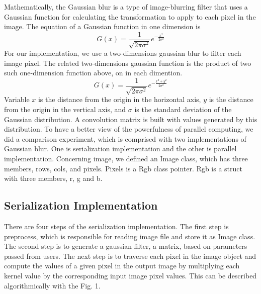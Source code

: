 \documentclass[journal,12pt,onecolumn,draftclsnofoot]{ieeeconf}  %
\begin{document}
Mathematically, the Gaussian blur is a type of image-blurring filter that uses a Gaussian function for calculating the transformation to apply to each pixel in the image. The equation of a Gaussian function in one dimension is 
    \[G(x) = \frac{1}{ \sqrt{2 \pi  \sigma ^{2} } } e^{ -\frac{ x^{2} }{2  \sigma ^{2} }} \]
 For our implementation, we use a two-dimensions gaussian blur to filter each image pixel. The related two-dimensions gaussian function is the product of two such one-dimension function above, on in each dimention. 
  \[G(x) = \frac{1}{ \sqrt{2 \pi   \sigma ^{2} } } e^{ -\frac{ x^{2} +  y^{2}}{2  \sigma ^{2} }}\]
 Variable $x$ is the distance from the origin in the horizontal axis, $y$ is the distance from the origin in the vertical axis, and $\sigma$ is the standard deviation of the Gaussian distribution. A convolution matrix is built with values generated by this distribution.  
 To have a better view of the powerfulness of parallel computing, we did a comparison experiment, which is comprised with two implementations of Gaussian blur. One is serialization implementation and the other is parallel implementation. 
 Concerning image, we defined an Image class, which has three members, rows, cols, and pixels. Pixels is a Rgb class pointer. Rgb is a struct with three members, r, g and b.

\subsection{Serialization  Implementation}
There are four steps of the serialization implementation. The first step is preprocess, which is responsible for reading image file and store it as Image class. The second step is to generate a gaussian filter, a matrix, based on parameters passed from users. The next step is to traverse each pixel in the image object and compute the values of a given pixel in the output image by multiplying each kernel value by the corresponding input image pixel values. This can be described algorithmically with the Fig. 1.
\end{document}
